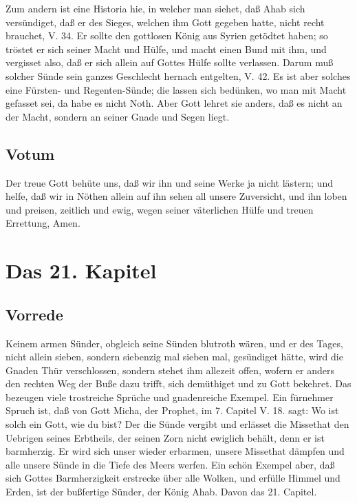 Zum andern ist eine Historia hie, in welcher man siehet, daß Ahab sich versündiget, daß er des Sieges, welchen ihm Gott gegeben hatte, nicht recht brauchet, V. 34. Er sollte den gottlosen König aus Syrien getödtet haben; so tröstet er sich seiner Macht und Hülfe, und macht einen Bund mit ihm, und vergisset also, daß er sich allein auf Gottes Hülfe sollte verlassen. Darum muß solcher Sünde sein ganzes Geschlecht hernach entgelten, V. 42. Es ist aber solches eine Fürsten- und Regenten-Sünde; die lassen sich bedünken, wo man mit Macht gefasset sei, da habe es nicht Noth. Aber Gott lehret sie anders, daß es nicht an der Macht, sondern an seiner Gnade und Segen liegt.

\section{Votum}

Der treue Gott behüte uns, daß wir ihn und seine Werke ja nicht lästern; und helfe, daß wir in Nöthen allein auf ihn sehen all unsere Zuversicht, und ihn loben und preisen, zeitlich und ewig, wegen seiner väterlichen Hülfe und treuen Errettung, Amen.

\chapter{Das 21. Kapitel}

\section{Vorrede}

Keinem armen Sünder, obgleich seine Sünden blutroth wären, und er des Tages, nicht allein sieben, sondern siebenzig mal sieben mal, gesündiget hätte, wird die Gnaden Thür verschlossen, sondern stehet ihm allezeit offen, wofern er anders den rechten Weg der Buße dazu trifft, sich demüthiget und zu Gott bekehret. Das bezeugen viele trostreiche Sprüche und gnadenreiche Exempel. Ein fürnehmer Spruch ist, daß von Gott Micha, der Prophet, im 7. Capitel V. 18. sagt: Wo ist solch ein Gott, wie du bist? Der die Sünde vergibt und erlässet die Missethat den Uebrigen seines Erbtheils, der seinen Zorn nicht ewiglich behält, denn er ist barmherzig. Er wird sich unser wieder erbarmen, unsere Missethat dämpfen und alle unsere Sünde in die Tiefe des Meers werfen. Ein schön Exempel aber, daß sich Gottes Barmherzigkeit erstrecke über alle Wolken, und erfülle Himmel und Erden, ist der bußfertige Sünder, der König Ahab. Davon das 21. Capitel.

